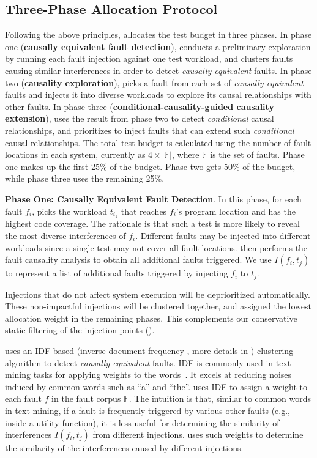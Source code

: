 \subsection{Three-Phase Allocation Protocol}
\label{sec:alloc:3pa}

Following the above principles, 
\tool allocates the test budget in three phases. 
In phase one (\textbf{causally equivalent fault detection}), 
\tool conducts a preliminary exploration 
by running each fault injection against one test workload, 
and clusters faults causing similar interferences 
in order to detect \textit{causally equivalent} faults. 
In phase two (\textbf{causality exploration}), 
\tool picks a fault from each set of \textit{causally equivalent} faults 
and injects it into diverse workloads 
to explore its causal relationships with other faults. 
In phase three (\textbf{conditional-causality-guided causality extension}),  
\tool uses the result from phase two to detect 
\textit{conditional} causal relationships, 
and prioritizes to inject faults that 
can extend such \textit{conditional} causal relationships. 
The total test budget is calculated 
using the number of fault locations in each system, 
currently as $4 \times |\mathbb{F}|$, 
where $\mathbb{F}$ is the set of faults.
Phase one makes up the first 25\% of the budget. Phase two  gets 50\% of the budget, while phase three uses the remaining 25\%.



\textbf{Phase One: Causally Equivalent Fault Detection}. 
In this phase, 
for each fault $f_i$, 
\tool picks the workload $t_{i_1}$ that reaches $f_i$'s program location 
and has the highest code coverage. 
The rationale is that 
such a test is more likely to 
reveal the most diverse interferences of $f_i$. 
Different faults may be injected into different workloads since a single test may not cover all fault locations. 
\tool then performs the fault causality analysis 
to obtain all additional faults triggered. 
We use $I(f_i, t_j)$ to represent a list of additional faults triggered by injecting $f_i$ to $t_j$. 


Injections that do not affect system execution 
will be deprioritized automatically.
These non-impactful injections will be clustered together, and assigned the lowest allocation weight in the remaining phases. 
This complements our conservative static filtering of the injection points ().  


\tool uses an IDF-based
(inverse document frequency \cite{schutze2008introduction}, more details in ) 
clustering algorithm 
to detect \textit{causally equivalent} faults.  
IDF is commonly used in text mining tasks 
for applying weights to the words~\cite{beel2016paper}. 
It excels at reducing noises induced by common words such as ``a'' and ``the''. 
\tool uses IDF to assign a weight to each fault $f$ in the fault corpus $\mathbb F$. 
The intuition is that, similar to common words in text mining, 
if a fault is frequently triggered by various other faults (e.g., inside a utility function), it is less useful for determining the similarity of interferences $I(f_i, t_j)$ from different injections. 
\tool uses such weights to determine the similarity of the interferences caused by different injections. 

